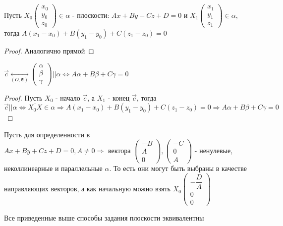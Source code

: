 \begin{proposition}
	Пусть \(X_0\begin{pmatrix}
		x_0 \\ y_0 \\ z_0
	\end{pmatrix}\in \alpha\) - плоскости: \(Ax+By+Cz+D=0\) и \(X_1\begin{pmatrix}
	x_1 \\ y_1 \\ z_1
	\end{pmatrix}\in \alpha\), тогда \(A(x_1-x_0)+B(y_1-y_0)+C(z_1-z_0) = 0\)
\end{proposition}
\begin{proof}
	Аналогично прямой
\end{proof}
\begin{corollary}
	\(\vec c \underset{(O, \mathfrak{E})}{\longleftrightarrow}
	\begin{pmatrix}
		\alpha \\ \beta \\ \gamma
	\end{pmatrix} || \alpha \Longleftrightarrow A\alpha+B\beta+C\gamma = 0\)
\end{corollary}
\begin{proof}
	Пусть \(X_0 \) - начало \(\vec c\), а \(X_1 \) - конец \(\vec c\), тогда \(\vec c || \alpha \Longleftrightarrow \overline{X_0X}\in \alpha \Longrightarrow A(x_1-x_0)+B(y_1-y_0)+C(z_1-z_0) = 0 \Longrightarrow A\alpha+B\beta+C\gamma = 0\)
\end{proof}
\begin{corollary}
	Пусть для определенности в \(Ax+By+Cz+D=0, A\ne0 \Longrightarrow \text{ вектора }\begin{pmatrix}
		-B \\ A \\ 0
	\end{pmatrix}, \begin{pmatrix}
	-C \\ 0 \\ A
	\end{pmatrix}\) - ненулевые, неколлинеарные и параллельные \(\alpha\). То есть они могут быть выбраны в качестве направляющих векторов, а как начальную можно взять \(X_0\begin{pmatrix}
	-\dfrac{D}{A} \\ 0 \\ 0
	\end{pmatrix}\)
\end{corollary}
\begin{corollary}
	Все приведенные выше способы задания плоскости эквивалентны
\end{corollary}
